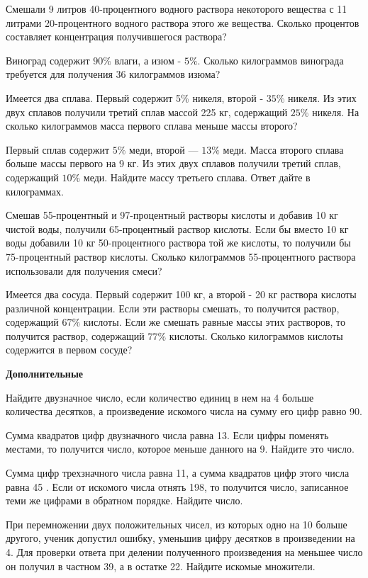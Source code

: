  Смешали 9 литров 40-процентного водного раствора некоторого вещества с 11 литрами 20-процентного водного раствора этого же вещества. Сколько процентов составляет концентрация получившегося раствора?


 Виноград содержит $90 \%$ влаги, а изюм - $5 \%$. Сколько килограммов винограда требуется для получения 36 килограммов изюма?


 Имеется два сплава. Первый содержит 5\% никеля, второй - $35 \%$ никеля. Из этих двух сплавов получили третий сплав массой 225 кг, содержащий $25 \%$ никеля. На сколько килограммов масса первого сплава меньше массы второго?


 Первый сплав содержит $5 \%$ меди, второй — $13 \%$ меди. Масса второго сплава больше массы первого на 9 кг. Из этих двух сплавов получили третий сплав, содержащий $10 \%$ меди. Найдите массу третьего сплава. Ответ дайте в килограммах.

 Смешав 55-процентный и 97-процентный растворы кислоты и добавив 10 кг чистой воды, получили 65-процентный раствор кислоты. Если бы вместо 10 кг воды добавили 10 кг 50-процентного раствора той же кислоты, то получили бы 75-процентный раствор кислоты. Сколько килограммов 55-процентного раствора использовали для получения смеси?


 Имеется два сосуда. Первый содержит 100 кг, а второй - 20 кг раствора кислоты различной концентрации. Если эти растворы смешать, то получится раствор, содержащий $67 \%$ кислоты. Если же смешать равные массы этих растворов, то получится раствор, содержащий $77 \%$ кислоты. Сколько килограммов кислоты содержится в первом сосуде?

\centerline{\bf \Huge Дополнительные}

 Найдите двузначное число, если количество единиц в нем на 4 больше количества десятков, а произведение искомого числа на сумму его цифр равно 90.

 Сумма квадратов цифр двузначного числа равна 13. Если цифры поменять местами, то получится число, которое меньше данного на 9. Найдите это число.

 Сумма цифр трехзначного числа равна 11, а сумма квадратов цифр этого числа равна 45 . Если от искомого числа отнять 198, то получится число, записанное теми же цифрами в обратном порядке. Найдите число.

 При перемножении двух положительных чисел, из которых одно на 10 больше другого, ученик допустил ошибку, уменьшив цифру десятков в произведении на 4. Для проверки ответа при делении полученного произведения на меньшее число он получил в частном 39, а в остатке 22. Найдите искомые множители.

